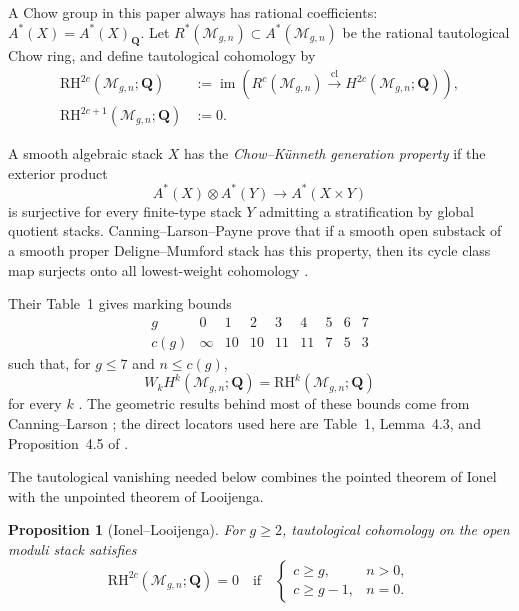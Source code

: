 \documentclass[12pt,reqno]{amsart}
\newcommand{\Q}{\mathbf{Q}}
\newcommand{\M}{\mathcal{M}}
\newcommand{\RH}{\mathrm{RH}}
\newcommand{\im}{\operatorname{im}}
\newtheorem{proposition}[theorem]{Proposition}
\theoremstyle{definition}
\theoremstyle{remark}
\begin{document}
A Chow group in this paper always has rational coefficients:
$A^*(X)=A^*(X)_{\Q}$.  Let $R^*(\M_{g,n})\subset A^*(\M_{g,n})$ be the
rational tautological Chow ring, and define tautological cohomology by
\begin{equation}\label{eq:RH-definition}
 \begin{aligned}
 \RH^{2c}(\M_{g,n};\Q)
 &:=\im\!\left(R^c(\M_{g,n})\xrightarrow{\mathrm{cl}}
 H^{2c}(\M_{g,n};\Q)\right),\\
 \RH^{2c+1}(\M_{g,n};\Q)&:=0.
 \end{aligned}
\end{equation}

A smooth algebraic stack $X$ has the \emph{Chow--K\"unneth generation
property} if the exterior product
\[
 A^*(X)\otimes A^*(Y)\longrightarrow A^*(X\times Y)
\]
is surjective for every finite-type stack $Y$ admitting a stratification by
global quotient stacks.  Canning--Larson--Payne prove that if a smooth open
substack of a smooth proper Deligne--Mumford stack has this property, then
its cycle class map surjects onto all lowest-weight cohomology
\cite[Lemma~4.3]{CLP}.

Their Table~1 gives marking bounds
\begin{equation}\label{eq:c-table}
\begin{array}{c|cccccccc}
g&0&1&2&3&4&5&6&7\\ \hline
c(g)&\infty&10&10&11&11&7&5&3
\end{array}
\end{equation}
such that, for $g\leq7$ and $n\leq c(g)$,
\begin{equation}\label{eq:CLP-pure-taut}
 W_kH^k(\M_{g,n};\Q)=\RH^k(\M_{g,n};\Q)
\end{equation}
for every $k$ \cite[Proposition~4.5]{CLP}.  The geometric results behind most
of these bounds come from Canning--Larson \cite{CanningLarsonStable}; the
direct locators used here are Table~1, Lemma~4.3, and Proposition~4.5 of
\cite{CLP}.

The tautological vanishing needed below combines the pointed theorem of
Ionel with the unpointed theorem of Looijenga.

\begin{proposition}[Ionel--Looijenga]\label{prop:ionel}
For $g\geq2$, tautological cohomology on the open moduli stack satisfies
\begin{equation}\label{eq:ionel}
 \RH^{2c}(\M_{g,n};\Q)=0
 \quad\text{if}\quad
 \begin{cases}
 c\geq g,&n>0,\\
 c\geq g-1,&n=0.
 \end{cases}
\end{equation}
\end{proposition}
\end{document}
